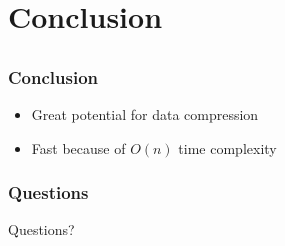 \documentclass[compress]{beamer}
\begin{document}
\section{Conclusion}
\subsection*{}

\begin{frame}
	\frametitle{Conclusion}

	\begin{itemize}[<+->]
		\item Great potential for data compression
		\item Fast because of $O(n)$ time complexity
	\end{itemize}
\end{frame}

\begin{frame}
	\frametitle{Questions}

	\begin{center}
		\Huge{Questions?}
	\end{center}
\end{frame}
\end{document}
